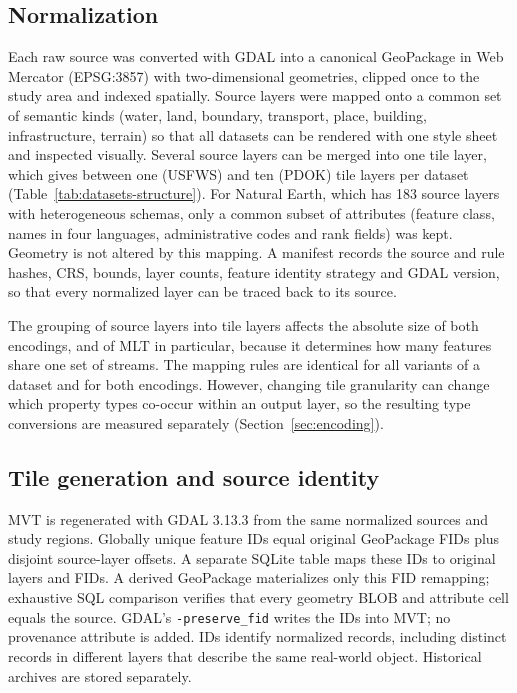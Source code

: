 


\subsection{Normalization}
\label{sec:normalization}

Each raw source was converted with GDAL into a canonical GeoPackage in Web Mercator
(EPSG:3857) with two-dimensional geometries, clipped once to the study area and indexed
spatially. Source layers were mapped onto a common set of semantic kinds (water, land,
boundary, transport, place, building, infrastructure, terrain) so that all datasets can
be rendered with one style sheet and inspected visually. Several source layers can be
merged into one tile layer, which gives between one (USFWS) and ten (PDOK) tile layers per
dataset (Table~\ref{tab:datasets-structure}). For Natural Earth, which has 183 source
layers with heterogeneous schemas, only a common subset of attributes (feature class,
names in four languages, administrative codes and rank fields) was kept. Geometry is not
altered by this mapping.
A manifest records the source and rule hashes, CRS, bounds, layer counts, feature
identity strategy and GDAL version, so that every normalized layer can be traced back to
its source.

The grouping of source layers into tile layers affects the absolute size of both
encodings, and of MLT in particular, because it determines how many features share one
set of streams. The mapping rules are identical for all variants of a dataset and for
both encodings. However, changing tile granularity can change which property types
co-occur within an output layer, so the resulting type conversions are measured
separately (Section~\ref{sec:encoding}).


\subsection{Tile generation and source identity}\label{sec:tile-generation}
MVT is regenerated with GDAL 3.13.3 from the same normalized sources and study
regions. Globally unique feature IDs equal original GeoPackage FIDs plus disjoint
source-layer offsets. A separate SQLite table maps these IDs to original layers and
FIDs. A derived GeoPackage materializes only this FID remapping; exhaustive SQL
comparison verifies that every geometry BLOB and attribute cell equals the source.
GDAL's \texttt{-preserve\_fid} writes the IDs into MVT; no provenance attribute is
added. IDs identify normalized records, including distinct records in different layers
that describe the same real-world object. Historical archives are stored separately.

